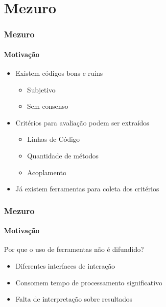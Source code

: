 \documentclass{beamer}
\begin{document}
\section{Mezuro}
\begin{frame}
  \frametitle{Mezuro}
  \framesubtitle{Motivação}
  \begin{itemize}
    \item Existem códigos bons e ruins
      \begin{itemize}
        \item Subjetivo
          \vspace{.25cm}
        \item Sem consenso
      \end{itemize}
      \vspace{.5cm}
    \item Critérios para avaliação podem ser extraídos
      \begin{itemize}
        \item Linhas de Código
          \vspace{.25cm}
        \item Quantidade de métodos
          \vspace{.25cm}
        \item Acoplamento
      \end{itemize}
      \vspace{.5cm}
    \item Já existem ferramentas para coleta dos critérios
  \end{itemize}
\end{frame}

\begin{frame}
  \frametitle{Mezuro}
  \framesubtitle{Motivação}

  Por que o uso de ferramentas não é difundido?

  \begin{itemize}
    \item Diferentes interfaces de interação
      \vspace{.5cm}
    \item Consomem tempo de processamento significativo
      \vspace{.5cm}
    \item Falta de interpretação sobre resultados
  \end{itemize}
\end{frame}
\end{document}
